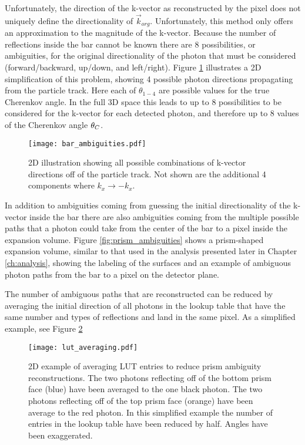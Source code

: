 Unfortunately, the direction of the k-vector as reconstructed by the pixel does not uniquely define the directionality of $\vec{k}_{org}$.
Unfortunately, this method only offers an approximation to the magnitude of the k-vector. Because the number of reflections inside the bar cannot be known there are 8 possibilities, or ambiguities, for the original directionality of the photon that must be considered (forward/backward, up/down, and left/right). Figure \ref{fig:bar_ambiguities} illustrates a 2D simplification of this problem, showing 4 possible photon directions propagating from the particle track. Here each of $\theta_{1-4}$ are possible values for the true Cherenkov angle. In the full 3D space this leads to up to 8 possibilities to be considered for the k-vector for each detected photon, and therefore up to 8 values of the Cherenkov angle $\theta_{C}$.

\begin{figure}[ht]
	\centering
	\texttt{[image: bar\_ambiguities.pdf]}
	\caption{2D illustration showing all possible combinations of k-vector directions off of the particle track. Not shown are the additional 4 components where $k_x \rightarrow -k_x$.}
	\label{fig:bar_ambiguities}
\end{figure}

In addition to ambiguities coming from guessing the initial directionality of the k-vector inside the bar there are also ambiguities coming from the multiple possible paths that a photon could take from the center of the bar to a pixel inside the expansion volume. Figure \ref{fig:prism_ambiguities} shows a prism-shaped expansion volume, similar to that used in the analysis presented later in Chapter \ref{ch:analysis}, showing the labeling of the surfaces and an example of ambiguous photon paths from the bar to a pixel on the detector plane.

The number of ambiguous paths that are reconstructed can be reduced by averaging the initial direction of all photons in the lookup table that have the same number and types of reflections and land in the same pixel. As a simplified example, see Figure \ref{fig:lut_averaging}

\begin{figure}[ht]
	\centering
	\texttt{[image: lut\_averaging.pdf]}
	\caption{2D example of averaging LUT entries to reduce prism ambiguity reconstructions. The two photons reflecting off of the bottom prism face (blue) have been averaged to the one black photon. The two photons reflecting off of the top prism face (orange) have been average to the red photon. In this simplified example the number of entries in the lookup table have been reduced by half. Angles have been exaggerated.}
	\label{fig:lut_averaging}
\end{figure}

